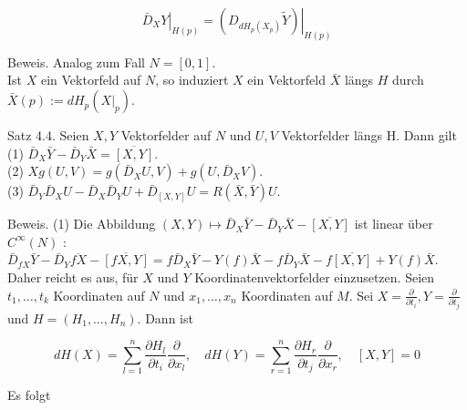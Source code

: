 \documentclass[10pt]{article}
\begin{document}
$$
\left.\bar{D}_{X} Y\right|_{H(p)}=\left.\left(D_{d H_{p}\left(X_{p}\right)} \tilde{Y}\right)\right|_{H(p)}
$$

Beweis. Analog zum Fall $N=[0,1]$.\\
Ist $X$ ein Vektorfeld auf $N$, so induziert $X$ ein Vektorfeld $\bar{X}$ längs $H$ durch $\bar{X}(p):=d H_{p}\left(\left.X\right|_{p}\right)$.

Satz 4.4. Seien $X, Y$ Vektorfelder auf $N$ und $U, V$ Vektorfelder längs H. Dann gilt\\
(1) $\bar{D}_{X} \bar{Y}-\bar{D}_{Y} \bar{X}=\overline{[X, Y]}$.\\
(2) $X g(U, V)=g\left(\bar{D}_{X} U, V\right)+g\left(U, \bar{D}_{X} V\right)$.\\
(3) $\bar{D}_{Y} \bar{D}_{X} U-\bar{D}_{X} \bar{D}_{Y} U+\bar{D}_{[X, Y]} U=R(\bar{X}, \bar{Y}) U$.

Beweis. (1) Die Abbildung $(X, Y) \mapsto \bar{D}_{X} \bar{Y}-\bar{D}_{Y} \bar{X}-\overline{[X, Y]}$ ist linear über $C^{\infty}(N)$ :\\
$\bar{D}_{f X} \bar{Y}-\bar{D}_{Y} \overline{f X}-\overline{[f X, Y]}=f \bar{D}_{X} \bar{Y}-Y(f) \bar{X}-f \bar{D}_{Y} \bar{X}-f \overline{[X, Y]}+Y(f) \bar{X}$.\\
Daher reicht es aus, für $X$ und $Y$ Koordinatenvektorfelder einzusetzen. Seien $t_{1}, \ldots, t_{k}$ Koordinaten auf $N$ und $x_{1}, \ldots, x_{n}$ Koordinaten auf $M$. Sei $X=\frac{\partial}{\partial t_{i}}, Y=\frac{\partial}{\partial t_{j}}$ und $H=\left(H_{1}, \ldots, H_{n}\right)$. Dann ist

$$
d H(X)=\sum_{l=1}^{n} \frac{\partial H_{l}}{\partial t_{i}} \frac{\partial}{\partial x_{l}}, \quad d H(Y)=\sum_{r=1}^{n} \frac{\partial H_{r}}{\partial t_{j}} \frac{\partial}{\partial x_{r}}, \quad[X, Y]=0
$$

Es folgt
\end{document}
